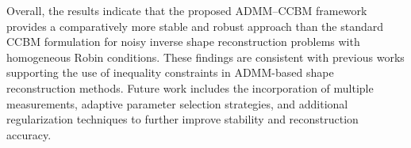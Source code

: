 \documentclass[a4paper,11pt]{article}
\begin{document}
Overall, the results indicate that the proposed ADMM--CCBM framework provides a comparatively more stable and robust approach than the standard CCBM formulation for noisy inverse shape reconstruction problems with homogeneous Robin conditions. These findings are consistent with previous works \cite{RabagoHadriAfraitesHendyZaky2024,CherratAfraitesRabago2025b,CherratAfraitesRabago2026} supporting the use of inequality constraints in ADMM-based shape reconstruction methods. Future work includes the incorporation of multiple measurements, adaptive parameter selection strategies, and additional regularization techniques to further improve stability and reconstruction accuracy.
\end{document}
